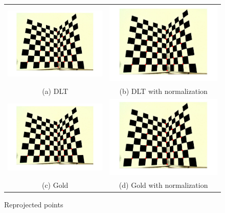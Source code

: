 \documentclass[paper=a4, fontsize=11pt]{scrartcl} %
\numberwithin{equation}{section} %
\numberwithin{figure}{section} %
\numberwithin{table}{section} %
\begin{document}
\begin{figure}
\centering
\begin{tabular}{cc}
  \includegraphics[width=85mm]{dlt_no_norm.jpg} &   \includegraphics[width=85mm]{dlt.jpg} \\
(a) DLT & (b) DLT with normalization \\[6pt]
  \includegraphics[width=85mm]{gold_no_norm.jpg} &   \includegraphics[width=85mm]{gold.jpg} \\
(c) Gold & (d) Gold with normalization \\[6pt]

\end{tabular}
\caption{Reprojected points}
\label{fig:repr}
\end{figure}
\end{document}
